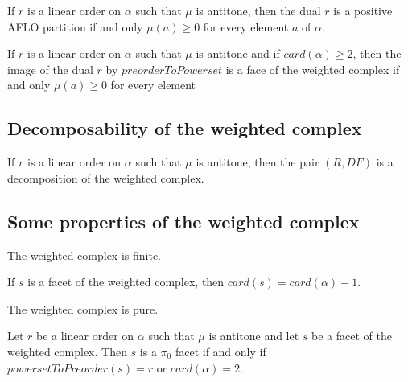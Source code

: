 \begin{sublemma}
If $r$ is a linear order on $\alpha$ such that $\mu$ is antitone, then the dual $r$ is a positive AFLO partition if and only $\mu(a)\geq 0$ for every element
$a$ of $\alpha$.

\end{sublemma}

\begin{sublemma}
If $r$ is a linear order on $\alpha$ such that $\mu$ is antitone and if $card(\alpha)\geq 2$, then the image of the dual $r$ by $preorderToPowerset$ is a 
face of the weighted complex if and only $\mu(a)\geq 0$ for every element

\end{sublemma}


\subsection{Decomposability of the weighted complex}

\begin{sublemma}
If $r$ is a linear order on $\alpha$ such that $\mu$ is antitone, then the pair $(R,DF)$ is a decomposition of the weighted complex.

\end{sublemma}

\subsection{Some properties of the weighted complex}

\begin{sublemma}
The weighted complex is finite.

\end{sublemma}

\begin{sublemma}
If $s$ is a facet of the weighted complex, then $card(s)=card(\alpha)-1$.

\end{sublemma}

\begin{sublemma}
The weighted complex is pure.

\end{sublemma}

\begin{sublemma}
Let $r$ be a linear order on $\alpha$ such that $\mu$ is antitone and let $s$ be a facet of the weighted complex. Then $s$ is a $\pi_0$ facet if
and only if $powersetToPreorder(s)=r$ or $card(\alpha)=2$.

\end{sublemma}


